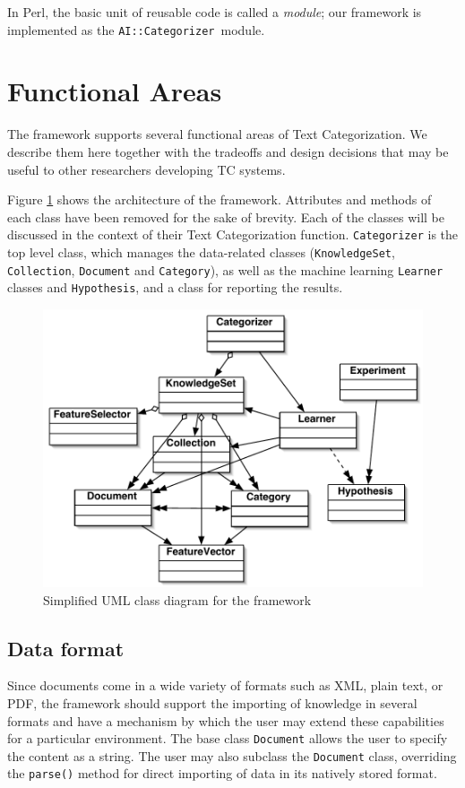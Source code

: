 \documentclass[twocolumn]{article}
\newcommand{\method}[1]{\texttt{#1()}}
\newcommand{\class}[1]{\texttt{#1}}
\newcommand{\aicat}{\texttt{AI::Cat\-e\-gor\-i\-zer}}
\begin{document}
In Perl, the basic unit of reusable code is called a \emph{module};
our framework is implemented as the \aicat\ module.

\section{Functional Areas}

The framework supports several functional areas of Text
Categorization. We describe them here together with the tradeoffs and
design decisions that may be useful to other researchers developing TC
systems.

Figure \ref{classes-uml} shows the architecture of the
framework. Attributes and methods of each class have been removed for
the sake of brevity. Each of the classes will be discussed in the
context of their Text Categorization function. \class{Categorizer} is
the top level class, which manages the data-related classes
(\class{KnowledgeSet}, \class{Collection}, \class{Document} and
\class{Category}), as well as the machine learning \class{Learner}
classes and \class{Hypothesis}, and a class for reporting the
results.


\begin{figure}
\includegraphics[width=\linewidth]{classes-uml.pdf}
\caption{Simplified UML class diagram for the framework}
\label{classes-uml}
\end{figure}

\subsection*{Data format}
Since documents come in a wide variety of formats such as XML, plain text,
or PDF, the framework should support the
importing of knowledge in several formats and have a mechanism by
which the user may extend these capabilities for a particular
environment.  The base class \class{Document} allows the user to
specify the content as a string.  The user may also subclass the
\class{Document} class, overriding the \method{parse} method for
direct importing of data in its natively stored format.
\end{document}
